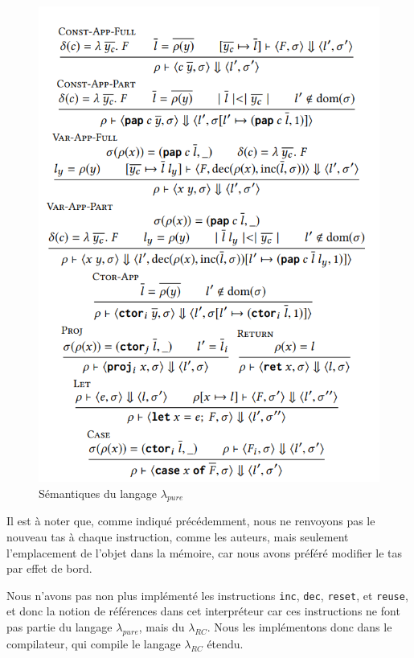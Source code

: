 \documentclass{rapportECL}
\begin{document}
\begin{figure}[hbt!]
	\centering
	\includegraphics[scale=0.70]{logos/semantics.png}
	\caption{Sémantiques du langage $\lambda_{pure}$}
	\label{fig:semantics}
\end{figure}
\FloatBarrier 


\bigskip


Il est à noter que, comme indiqué précédemment, nous ne renvoyons pas le nouveau tas à chaque instruction, comme les auteurs, 
mais seulement l'emplacement de l'objet dans la mémoire, car nous avons préféré modifier le tas par effet de bord.

Nous n'avons pas non plus implémenté les instructions \verb|inc|, \verb|dec|, \verb|reset|, et \verb|reuse|, et donc la notion
de références dans cet interpréteur car ces instructions ne font pas partie du langage $\lambda_{pure}$, mais du $\lambda_{RC}$.
Nous les implémentons donc dans le compilateur, qui compile le langage $\lambda_{RC}$ étendu.
\end{document}
